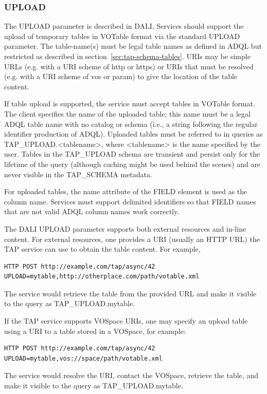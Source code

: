 \documentclass[11pt,letter]{ivoa}
\newcommand{\tapschema}{TAP\_SCHE\-MA}
\newcommand{\tapupload}{TAP\_UPLOAD}
\newcommand{\tapschema}{\mbox{%
  \relsize{-0.5}TAP\discretionary{-}{}{\kern-2pt\_}SCHEMA}}
\newcommand{\tapupload}{%
  {\relsize{-0.5}TAP\discretionary{-}{}{\kern-2pt\_}UPLOAD}}
\begin{document}
\subsubsection{UPLOAD}
\label{sec:UPLOAD}

The UPLOAD parameter is described in DALI. Services should support 
the 
upload of temporary tables in VOTable \citep{2013ivoa.spec.0920O} format via the standard 
UPLOAD 
parameter. The table-name(s) must be legal table names as defined in 
ADQL \citep{2008ivoa.spec.1030O} but restricted as described in section~\ref{sec:tap-schema-tables}. 
URIs may be simple URLs (e.g. with a URI scheme of http or https) or 
URIs that must be resolved (e.g. with a URI scheme of vos or param) to give 
the location of the table content.

If table upload is supported, the service must accept tables in VOTable format. 
The client specifies the name of the uploaded table; this name must be a legal 
ADQL table name with no catalog or schema (i.e., a string following the 
regular identifier production of ADQL). Uploaded tables must be 
referred 
to in queries as \tapupload.<tablename>, where <tablename> is the name
specified by the user. Tables in the \tapupload{} schema are 
transient and persist only for the lifetime of the query (although caching might 
be used behind the scenes) and are never visible in the 
\tapschema{} metadata.

For uploaded tables, the name attribute of the FIELD element is used as the column 
name. Services must support delimited identifiers so that 
FIELD names that are not valid ADQL column names work correctly.

The DALI UPLOAD parameter supports both external resources and 
in-line 
content. For external resources, one provides a URI (usually an HTTP URL) the 
TAP service can use to obtain the table content. For example,
\begin{verbatim}
HTTP POST http://example.com/tap/async/42
UPLOAD=mytable,http://otherplace.com/path/votable.xml
\end{verbatim}
The service would retrieve the table from the provided URL and 
make it visible to the query as \tapupload.mytable.

If the TAP service supports VOSpace URIs, one may 
specify an upload table using a URI to a table stored in a VOSpace, for example:
\begin{verbatim}
HTTP POST http://example.com/tap/async/42
UPLOAD=mytable,vos://space/path/votable.xml
\end{verbatim}
The service would resolve the URI, contact the VOSpace, retrieve the table, and 
make it visible to the query as \tapupload.mytable.
\end{document}
